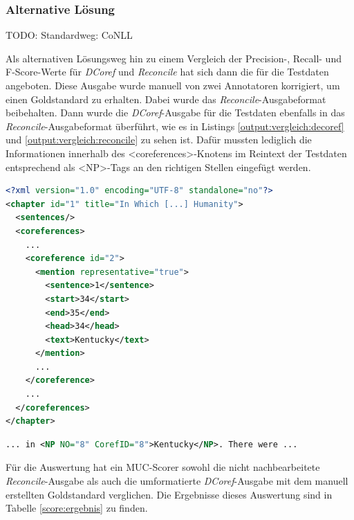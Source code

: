 \documentclass[a4paper,12pt,titlepage=true, ngerman]{scrartcl}
\begin{document}

\subsubsection{Alternative Lösung}%

TODO: Standardweg: CoNLL

Als alternativen Lösungsweg hin zu einem Vergleich der Precision-, Recall- und F-Score-Werte für \emph{DCoref} 
und \emph{Reconcile} hat sich dann die  für die Testdaten angeboten. %
Diese Ausgabe wurde manuell von zwei Annotatoren korrigiert, um einen Goldstandard zu erhalten. 
Dabei wurde das \emph{Reconcile}-Ausgabeformat beibehalten. 
Dann wurde die \emph{DCoref}-Ausgabe für die Testdaten ebenfalls in das \emph{Reconcile}-Ausgabeformat überführt, 
wie es in Listings  \ref{output:vergleich:decoref} und \ref{output:vergleich:reconcile} zu sehen ist. 
Dafür mussten lediglich die Informationen innerhalb des <coreferences>-Knotens im Reintext der Testdaten 
entsprechend als <NP>-Tags an den richtigen Stellen eingefügt werden.

\begin{lstlisting}[label=output:vergleich:decoref, name=vergleich_decoref.xml, language=xml, caption=Ausschnitt der \emph{DCoref}-Ausgabe für die Testdaten]
<?xml version="1.0" encoding="UTF-8" standalone="no"?>
<chapter id="1" title="In Which [...] Humanity">
  <sentences/>
  <coreferences>
    ...
    <coreference id="2">
      <mention representative="true">
        <sentence>1</sentence>
        <start>34</start>
        <end>35</end>
        <head>34</head>
        <text>Kentucky</text>
      </mention>
      ...
    </coreference>
    ...
  </coreferences>
</chapter>
\end{lstlisting}

\begin{lstlisting}[label=output:vergleich:reconcile, name=vergleich_reconcile.xml, language=xml, caption=Ausschnitt aus Listing \ref{output:vergleich:reconcile} im \emph{Reconcile}-Ausgabeformat]
... in <NP NO="8" CorefID="8">Kentucky</NP>. There were ...
\end{lstlisting}

\noindent 
Für die Auswertung hat ein MUC-Scorer sowohl die nicht nachbearbeitete \emph{Reconcile}-Ausgabe als auch 
die umformatierte \emph{DCoref}-Ausgabe mit dem manuell erstellten Goldstandard verglichen. 
Die Ergebnisse dieses Auswertung sind in Tabelle \ref{score:ergebnis} zu finden.
\end{document}
